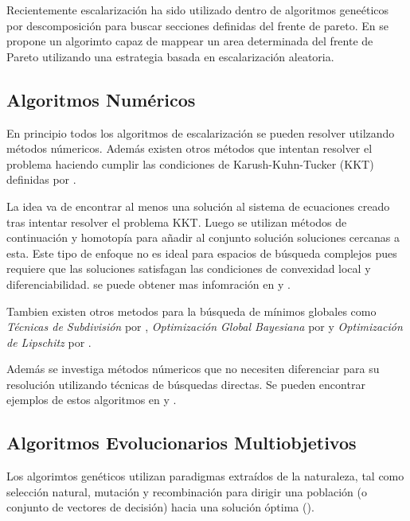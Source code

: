 Recientemente escalarizaci\'on ha sido utilizado dentro de algoritmos gene\'eticos por descomposici\'on para buscar secciones definidas del frente de pareto.  En \cite{paria2020flexible} se propone un algorimto capaz de mappear un area determinada del frente de Pareto utilizando una estrategia basada en escalarizaci\'on aleatoria.


\subsection{Algoritmos Num\'ericos}

En principio todos los algoritmos de escalarizaci\'on se pueden resolver utilzando m\'etodos n\'umericos. Adem\'as existen otros m\'etodos  que intentan resolver el problema haciendo cumplir las condiciones de Karush-Kuhn-Tucker (KKT) definidas por \cite{kuhn2014nonlinear}.

La idea va de encontrar al menos una soluci\'on al sistema de ecuaciones creado tras intentar resolver el problema KKT. Luego se utilizan m\'etodos de continuaci\'on y homotop\'ia para añadir al conjunto soluci\'on soluciones cercanas a esta. 
Este tipo de enfoque no es ideal para espacios de b\'usqueda complejos pues requiere que las soluciones satisfagan las condiciones de convexidad local y diferenciabilidad. se puede obtener mas infomraci\'on en \cite{hillermeier2001nonlinear} y \cite{schutze_et_al:DagSemProc.04461.16}.

Tambien existen otros metodos para la b\'usqueda de m\'inimos globales como \textit{T\'ecnicas de Subdivisi\'on} por \cite{dellnitz2005covering}, \textit{Optimizaci\'on Global Bayesiana} por \cite{emmerich2016multicriteria} y \textit{Optimizaci\'on de Lipschitz} por \cite{vzilinskas2013worst}. %

Adem\'as  se investiga  m\'etodos n\'umericos que no necesiten diferenciar para su resoluci\'on utilizando t\'ecnicas de b\'usquedas directas. Se pueden encontrar ejemplos de estos algoritmos en \cite{custodio2011direct} y \cite{audet2010mesh}.

\subsection{Algoritmos Evolucionarios Multiobjetivos }

Los algorimtos gen\'eticos utilizan paradigmas extra\'idos de la naturaleza, tal como selecci\'on natural, mutaci\'on y recombinaci\'on para dirigir una poblaci\'on (o conjunto de vectores de decisi\'on) hacia una soluci\'on \'optima (\cite{back1996evolutionary}).

